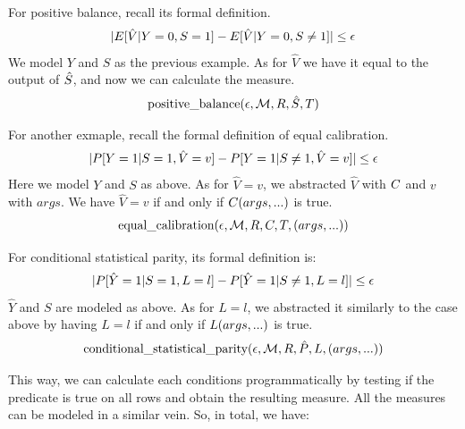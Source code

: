 \documentclass[conference]{IEEEtran}
\begin{document}
For positive balance, recall its formal definition.
\begin{align*}
    \lvert E[\hat{V} | Y = 0, S = 1] - E[\hat{V} | Y = 0, S \neq 1]\rvert \leq \epsilon
\end{align*}
We model $Y$ and $S$ as the previous example. As for $\hat{V}$ we have it equal to the output of $\hat{S}$, and now we can calculate the measure.
\begin{align*}
    \text{positive\_balance} (\epsilon, \mathcal{M}, R, \hat{S}, T)
\end{align*}

For another exmaple, recall the formal definition of equal calibration.
\begin{align*}
    \lvert P[Y = 1 | S = 1, \hat{V} = v] - P[Y = 1 | S \neq 1, \hat{V} = v]\rvert \leq \epsilon
\end{align*}
Here we model $Y$ and $S$ as above. As for $\hat{V} = v$, we abstracted $\hat{V}$ with $C$ and $v$ with $args$. We have $\hat{V} = v$ if and only if $C(args, ...)$ is true.
\begin{align*}
    \text{equal\_calibration} (\epsilon, \mathcal{M}, R, C, T, (args, ...))
\end{align*}

For conditional statistical parity, its formal definition is:
\[
    \lvert P[\hat{Y} = 1 | S = 1, L = l] - P[\hat{Y} = 1 | S \neq 1, L = l]\rvert \leq \epsilon
\]
$\hat{Y}$ and $S$ are modeled as above. As for $L = l$, we abstracted it similarly to the case above by having $L = l$ if and only if $L(args, ...)$ is true.
\begin{align*}
    \text{conditional\_statistical\_parity} (\epsilon, \mathcal{M}, R, \hat{P}, L, (args, ...))
\end{align*}

This way, we can calculate each conditions programmatically by testing if the predicate is true on all rows and obtain the resulting measure. All the measures can be modeled in a similar vein. So, in total, we have:
\end{document}
